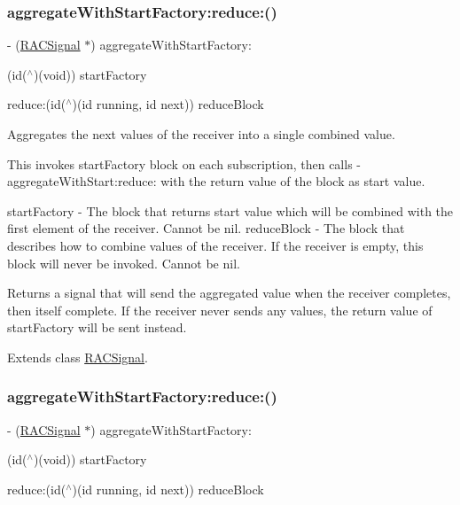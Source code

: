 \subsubsection{\texorpdfstring{aggregate\+With\+Start\+Factory\+:reduce\+:()}{aggregateWithStartFactory:reduce:()}\hspace{0.1cm}{\footnotesize\ttfamily [1/3]}}
{\footnotesize\ttfamily -\/ (\mbox{\hyperlink{interface_r_a_c_signal}{R\+A\+C\+Signal}} $\ast$) aggregate\+With\+Start\+Factory\+: \begin{DoxyParamCaption}\item[{(id($^\wedge$)(void))}]{start\+Factory }\item[{reduce:(id($^\wedge$)(id running, id next))}]{reduce\+Block }\end{DoxyParamCaption}}

Aggregates the {\ttfamily next} values of the receiver into a single combined value.

This invokes {\ttfamily start\+Factory} block on each subscription, then calls -\/aggregate\+With\+Start\+:reduce\+: with the return value of the block as start value.

start\+Factory -\/ The block that returns start value which will be combined with the first element of the receiver. Cannot be nil. reduce\+Block -\/ The block that describes how to combine values of the receiver. If the receiver is empty, this block will never be invoked. Cannot be nil.

Returns a signal that will send the aggregated value when the receiver completes, then itself complete. If the receiver never sends any values, the return value of {\ttfamily start\+Factory} will be sent instead. 

Extends class \mbox{\hyperlink{interface_r_a_c_signal_a51c08c7a357f83c96c468a6aa13d4d87}{R\+A\+C\+Signal}}.

\mbox{\label{category_r_a_c_signal_07_operations_08_a51c08c7a357f83c96c468a6aa13d4d87}} 
\subsubsection{\texorpdfstring{aggregate\+With\+Start\+Factory\+:reduce\+:()}{aggregateWithStartFactory:reduce:()}\hspace{0.1cm}{\footnotesize\ttfamily [2/3]}}
{\footnotesize\ttfamily -\/ (\mbox{\hyperlink{interface_r_a_c_signal}{R\+A\+C\+Signal}} $\ast$) aggregate\+With\+Start\+Factory\+: \begin{DoxyParamCaption}\item[{(id($^\wedge$)(void))}]{start\+Factory }\item[{reduce:(id($^\wedge$)(id running, id next))}]{reduce\+Block }\end{DoxyParamCaption}}


